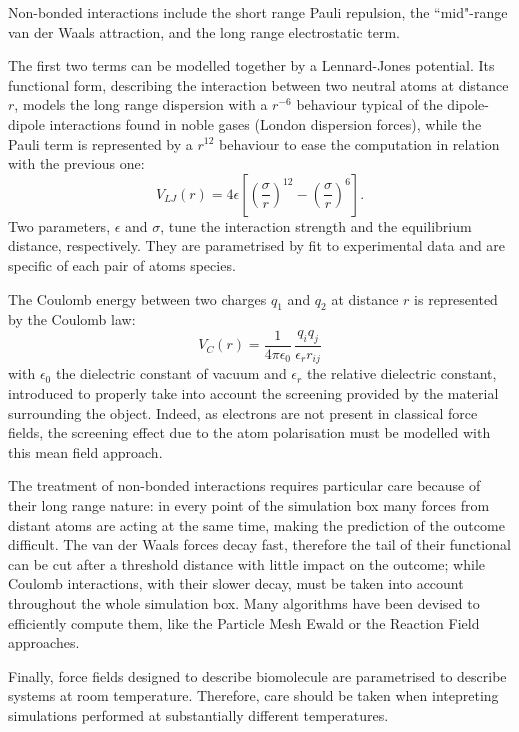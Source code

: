 \documentclass[graybox]{svmult}
\begin{document}
Non-bonded interactions include the short range Pauli repulsion, the ``mid"-range van der Waals attraction, and the long range electrostatic term.

The first two terms can be modelled together by a Lennard-Jones potential. Its functional form, describing the interaction between two neutral atoms at distance $r$, models the long range dispersion with a $r^{-6}$ behaviour typical of the dipole-dipole interactions found in noble gases (London dispersion forces), while the Pauli term is represented by a $r^{12}$ behaviour to ease the computation in relation with the previous one:
\begin{equation}
V_{LJ}(r) = 4 \epsilon \left[ \left( \frac{\sigma}{r} \right)^{12} - \left( \frac{\sigma}{r} \right)^6 \right].
\end{equation}
Two parameters, $\epsilon$ and $\sigma$, tune the interaction strength and the equilibrium distance, respectively. They are parametrised by fit to experimental data and are specific of each pair of atoms species.

The Coulomb energy between two charges $q_1$ and $q_2$ at distance $r$ is represented by the Coulomb law:
\begin{equation}
V_C(r) = \frac{1}{4 \pi \epsilon_0} \, \frac{q_i q_j}{\epsilon_r r_{ij}}
\end{equation}
with $\epsilon_0$ the dielectric constant of vacuum and $\epsilon_r$ the relative dielectric constant, introduced to properly take into account the screening provided by the material surrounding the object. Indeed, as electrons are not present in classical force fields, the screening effect due to the atom polarisation must be modelled with this mean field approach.

The treatment of non-bonded interactions requires particular care because of their long range nature: in every point of the simulation box many forces from distant atoms are acting at the same time, making the prediction of the outcome difficult.
%
The van der Waals forces decay fast, therefore the tail of their functional can be cut after a threshold distance with little impact on the outcome; while Coulomb interactions, with their slower decay, must be taken into account throughout the whole simulation box. Many algorithms have been devised to efficiently compute them, like the Particle Mesh Ewald \cite{Essmann1995} or the Reaction Field \cite{Tironi1995} approaches. 

Finally, force fields designed to describe biomolecule are parametrised to describe systems at room temperature. Therefore, care should be taken when intepreting simulations performed at substantially different temperatures.
\end{document}
